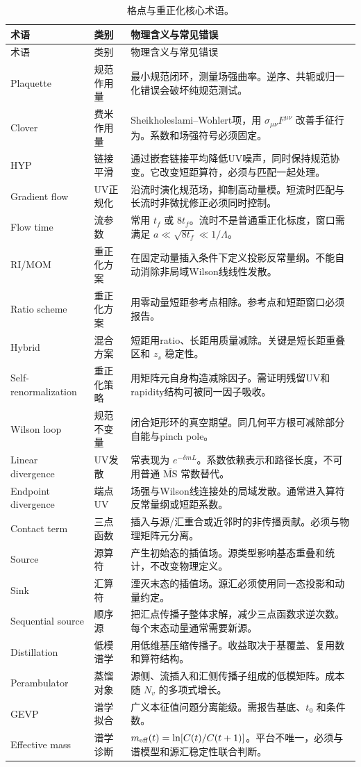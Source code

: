 \documentclass[UTF8,12pt,a4paper,twoside,openany]{ctexbook}
\newcommand{\MSbar}{\overline{\mathrm{MS}}}
\begin{document}
{\small
\begin{longtable}{L{2.8cm}L{1.9cm}L{8.7cm}}
\caption{格点与重正化核心术语。}\label{tab:glossary-lattice}\\
\toprule
术语 & 类别 & 物理含义与常见错误 \\
\midrule
\endfirsthead
\toprule
术语 & 类别 & 物理含义与常见错误 \\
\midrule
\endhead
\bottomrule
\endfoot
Plaquette & 规范作用量 & 最小规范闭环，测量场强曲率。逆序、共轭或归一化错误会破坏纯规范测试。 \\
Clover & 费米作用量 & Sheikholeslami--Wohlert项，用 \(\sigma_{\mu\nu}F^{\mu\nu}\) 改善手征行为。系数和场强符号必须固定。 \\
HYP & 链接平滑 & 通过嵌套链接平均降低UV噪声，同时保持规范协变。它改变短距算符，必须与匹配一起处理。 \\
Gradient flow & UV正规化 & 沿流时演化规范场，抑制高动量模。短流时匹配与长流时非微扰修正必须同时控制。 \\
Flow time & 流参数 & 常用 \(t_f\) 或 \(8t_f\)。流时不是普通重正化标度，窗口需满足 \(a\ll\sqrt{8t_f}\ll1/\Lambda\)。 \\
RI/MOM & 重正化方案 & 在固定动量插入条件下定义投影反常量纲。不能自动消除非局域Wilson线线性发散。 \\
Ratio scheme & 重正化方案 & 用零动量短距参考点相除。参考点和短距窗口必须报告。 \\
Hybrid & 混合方案 & 短距用ratio、长距用质量减除。关键是短长距重叠区和 \(z_s\) 稳定性。 \\
Self-renormalization & 重正化策略 & 用矩阵元自身构造减除因子。需证明残留UV和rapidity结构可被同一因子吸收。 \\
Wilson loop & 规范不变量 & 闭合矩形环的真空期望。同几何平方根可减除部分自能与pinch pole。 \\
Linear divergence & UV发散 & 常表现为 \(e^{-\delta m L}\)。系数依赖表示和路径长度，不可用普通 \(\MSbar\) 常数替代。 \\
Endpoint divergence & 端点UV & 场强与Wilson线连接处的局域发散。通常进入算符反常量纲或短距系数。 \\
Contact term & 三点函数 & 插入与源/汇重合或近邻时的非传播贡献。必须与物理矩阵元分离。 \\
Source & 源算符 & 产生初始态的插值场。源类型影响基态重叠和统计，不改变物理定义。 \\
Sink & 汇算符 & 湮灭末态的插值场。源汇必须使用同一态投影和动量约定。 \\
Sequential source & 顺序源 & 把汇点传播子整体求解，减少三点函数求逆次数。每个末态动量通常需要新源。 \\
Distillation & 低模谱学 & 用低维基压缩传播子。收益取决于基覆盖、复用数和算符结构。 \\
Perambulator & 蒸馏对象 & 源侧、流插入和汇侧传播子组成的低模矩阵。成本随 \(N_v\) 的多项式增长。 \\
GEVP & 谱学拟合 & 广义本征值问题分离能级。需报告基底、\(t_0\) 和条件数。 \\
Effective mass & 谱学诊断 & \(m_{\rm eff}(t)=\ln[C(t)/C(t+1)]\)。平台不唯一，必须与谱模型和源汇稳定性联合判断。 \\
\end{longtable}
}
\end{document}
